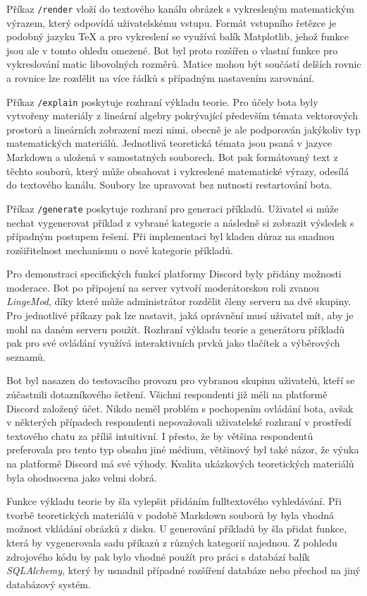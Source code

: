 \documentclass[FM]{tulthesis}
\begin{document}
	Příkaz \verb|/render| vloží do textového kanálu obrázek s vykresleným matematickým výrazem, který odpovídá uživatelskému vstupu. Formát vstupního řetězce je podobný jazyku TeX a pro vykreslení se využívá balík Matplotlib, jehož funkce jsou ale v tomto ohledu omezené. Bot byl proto rozšířen o vlastní funkce pro vykreslování matic libovolných rozměrů. Matice mohou být součástí delších rovnic a rovnice lze rozdělit na více řádků s případným nastavením zarovnání.
	
	Příkaz \verb|/explain| poskytuje rozhraní výkladu teorie. Pro účely bota byly vytvořeny materiály z lineární algebry pokrývající především témata vektorových prostorů a lineárních zobrazení mezi nimi, obecně je ale podporován jakýkoliv typ matematických materiálů. Jednotlivá teoretická témata jsou psaná v jazyce Markdown a uložená v samostatných souborech. Bot pak formátovaný text z těchto souborů, který může obsahovat i vykreslené matematické výrazy, odesílá do textového kanálu. Soubory lze upravovat bez nutnosti restartování bota.
	
	Příkaz \verb|/generate| poskytuje rozhraní pro generaci příkladů. Uživatel si může nechat vygenerovat příklad z vybrané kategorie a následně si zobrazit výsledek s případným postupem řešení. Při implementaci byl kladen důraz na snadnou rozšiřitelnost mechanismu o nové kategorie příkladů.
	
	Pro demonstraci specifických funkcí platformy Discord byly přidány možnosti moderace. Bot po připojení na server vytvoří moderátorskou roli zvanou \textit{LingeMod}, díky které může administrátor rozdělit členy serveru na dvě skupiny. Pro jednotlivé příkazy pak lze nastavit, jaká oprávnění musí uživatel mít, aby je mohl na daném serveru použít. Rozhraní výkladu teorie a generátoru příkladů pak pro své ovládání využívá interaktivních prvků jako tlačítek a výběrových seznamů.
	
	Bot byl nasazen do testovacího provozu pro vybranou skupinu uživatelů, kteří se zúčastnili dotazníkového šetření. Všichni respondenti již měli na platformě Discord založený účet. Nikdo neměl problém s pochopením ovládání bota, avšak v některých případech respondenti nepovažovali uživatelské rozhraní v prostředí textového chatu za příliš intuitivní. I přesto, že by většina respondentů preferovala pro tento typ obsahu jiné médium, většinový byl také názor, že výuka na platformě Discord má své výhody. Kvalita ukázkových teoretických materiálů byla ohodnocena jako velmi dobrá.
	
	Funkce výkladu teorie by šla vylepšit přidáním fulltextového vyhledávání. Při tvorbě teoretických materiálů v podobě Markdown souborů by byla vhodná možnost vkládání obrázků z disku. U generování příkladů by šla přidat funkce, která by vygenerovala sadu příkazů z různých kategorií najednou. Z pohledu zdrojového kódu by pak bylo vhodné použít pro práci s databází balík \textit{SQLAlchemy}, který by usnadnil případné rozšíření databáze nebo přechod na jiný databázový systém.
	
\end{document}
